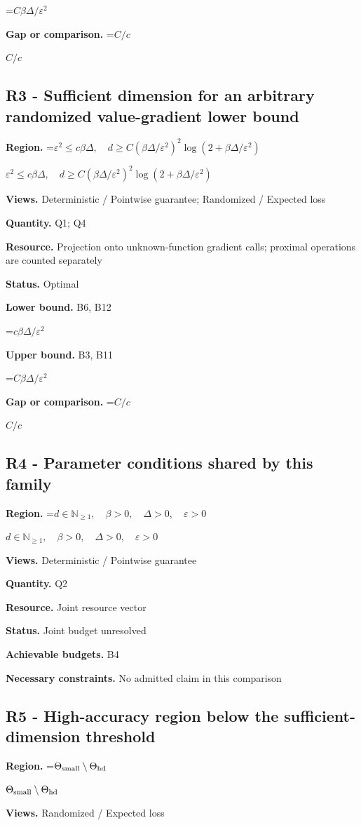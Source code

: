 \documentclass[10pt,a4paper]{article}
\newcommand{\AtlasMath}[1]{\par\begingroup\centering\setbox0=\hbox{$\displaystyle #1$}\ifdim\wd0>1.4\linewidth\typeout{ATLAS WIDE FORMULA: \the\wd0}\fi\ifdim\wd0>\linewidth\resizebox{\linewidth}{!}{\box0}\else\box0\fi\par\endgroup}
\newcommand{\AtlasInlineMath}[1]{\begingroup\setbox0=\hbox{$#1$}\ifdim\wd0>.4\linewidth\endgroup\AtlasMath{#1}\else\endgroup$#1$\fi}
\begin{document}
\AtlasMath{C\beta\Delta/\varepsilon^2}
\textbf{Gap or comparison.} \AtlasInlineMath{C/c}

\subsection{R3 - Sufficient dimension for an arbitrary randomized value-gradient lower bound}
\textbf{Region.} \AtlasInlineMath{\varepsilon^2\le c\beta\Delta,\quad d\ge C(\beta\Delta/\varepsilon^2)^2\log(2+\beta\Delta/\varepsilon^2)}

\textbf{Views.} Deterministic / Pointwise guarantee; Randomized / Expected loss

\textbf{Quantity.} Q1; Q4

\textbf{Resource.} Projection onto unknown-function gradient calls; proximal operations are counted separately

\textbf{Status.} Optimal

\textbf{Lower bound.} B6, B12

\AtlasMath{c\beta\Delta/\varepsilon^2}
\textbf{Upper bound.} B3, B11

\AtlasMath{C\beta\Delta/\varepsilon^2}
\textbf{Gap or comparison.} \AtlasInlineMath{C/c}

\subsection{R4 - Parameter conditions shared by this family}
\textbf{Region.} \AtlasInlineMath{d\in\mathbb{N}_{\ge1},\quad \beta>0,\quad \Delta>0,\quad \varepsilon>0}

\textbf{Views.} Deterministic / Pointwise guarantee

\textbf{Quantity.} Q2

\textbf{Resource.} Joint resource vector

\textbf{Status.} Joint budget unresolved

\textbf{Achievable budgets.} B4

\textbf{Necessary constraints.} No admitted claim in this comparison

\subsection{R5 - High-accuracy region below the sufficient-dimension threshold}
\textbf{Region.} \AtlasInlineMath{\Theta_{\rm small}\setminus\Theta_{\rm hd}}

\textbf{Views.} Randomized / Expected loss
\end{document}

